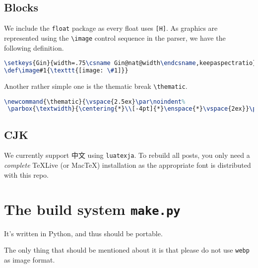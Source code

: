 \section{Blocks}
We include the \verb!float! package as every float uses \verb![H]!. As graphics are represented using the \verb!\image! control sequence in the parser, we have the following definition.\par
\begin{lstlisting}[language=TeX]
\setkeys{Gin}{width=.75\csname Gin@nat@width\endcsname,keepaspectratio}
\def\image#1{\texttt{[image: \#1]}}
\end{lstlisting}
Another rather simple one is the thematic break \verb!\thematic!.\par
\begin{lstlisting}[language=TeX]
\newcommand{\thematic}{\vspace{2.5ex}\par\noindent%
 \parbox{\textwidth}{\centering{*}\\[-4pt]{*}\enspace{*}\vspace{2ex}}\par}
\end{lstlisting}
\section{CJK}
We currently support 中文 using \verb!luatexja!. To rebuild all posts, you only need a \textit{complete} TeXLive (or MacTeX) installation as the appropriate font is distributed with this repo.\par
\chapter{The build system \texttt{make.py}}
It's written in Python, and thus should be portable.\par
The only thing that should be mentioned about it is that please do not use \verb!webp! as image format.\par
